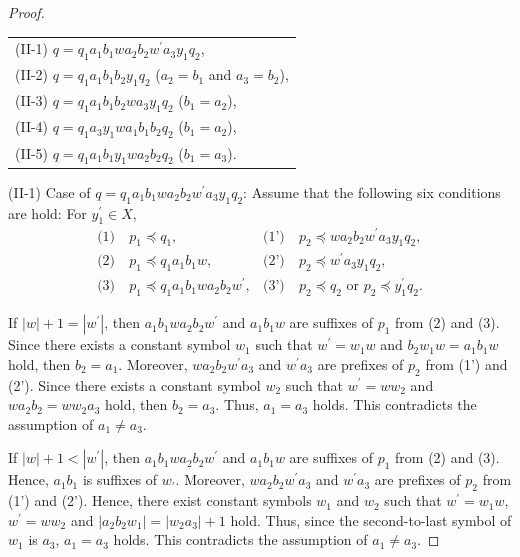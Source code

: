 \begin{proof}
\begin{tabular}{l}
(II-1) $q=q_{1}a_{1}b_{1}wa_{2}b_{2}w^{\prime}a_{3}y_{1}q_{2}$,\\
(II-2) $q=q_{1}a_{1}b_{1}b_{2}y_{1}q_{2}$ ($a_{2}=b_{1}$ and $a_{3}=b_{2}$),\\
(II-3) $q=q_{1}a_{1}b_{1}b_{2}wa_{3}y_{1}q_{2}$ ($b_{1}=a_{2}$),\\
(II-4) $q=q_{1}a_{3}y_{1}wa_{1}b_{1}b_{2}q_{2}$ ($b_{1}=a_{2}$),\\
(II-5) $q=q_{1}a_{1}b_{1}y_{1}wa_{2}b_{2}q_{2}$ ($b_{1}=a_{3}$).
\end{tabular}

\smallskip
\noindent
(II-1) Case of $q=q_{1}a_{1}b_{1}wa_{2}b_{2}w^{\prime}a_{3}y_{1}q_{2}$:
Assume that the following six conditions are hold: For $y_{1}^{\prime}\in X$,
\begin{align*}
\textrm{(1)}~& p_{1} \preceq q_{1}, & \textrm{(1')}~& p_{2} \preceq wa_{2}b_{2}w^{\prime}a_{3}y_{1}q_{2}, \\
\textrm{(2)}~& p_{1} \preceq q_{1}a_{1}b_{1}w, & \textrm{(2')}~& p_{2} \preceq w^{\prime}a_{3}y_{1}q_{2}, \\
\textrm{(3)}~& p_{1} \preceq q_{1}a_{1}b_{1}wa_{2}b_{2}w^{\prime}, & \textrm{(3')}~& p_{2} \preceq q_{2} \mbox{~or~} p_{2} \preceq y_{1}^{\prime}q_{2}.
\end{align*}

If $|w|+1=|w^{\prime}|$, then $a_{1}b_{1}wa_{2}b_{2}w^{\prime}$ and $a_{1}b_{1}w$ are suffixes of $p_{1}$ from (2) and (3).
Since there exists a constant symbol $w_{1}$ such that $w^{\prime}=w_{1}w$ and $b_{2}w_{1}w=a_{1}b_{1}w$ hold,
then $b_{2}=a_{1}$.
Moreover, $wa_{2}b_{2}w^{\prime}a_{3}$ and $w^{\prime}a_{3}$ are prefixes of $p_{2}$ from (1') and (2').
Since there exists a constant symbol $w_{2}$ such that $w^{\prime}=ww_{2}$ and $wa_{2}b_{2}=ww_{2}a_{3}$ hold,
then $b_{2}=a_{3}$.
Thus, $a_{1} = a_{3}$ holds.
This contradicts the assumption of $a_{1} \ne a_{3}$.

If $|w|+1 < |w^{\prime}|$, then $a_{1}b_{1}wa_{2}b_{2}w^{\prime}$ and $a_{1}b_{1}w$ are suffixes of $p_{1}$ from (2) and (3).
Hence, $a_{1}b_{1}$ is suffixes of $w_{\prime}$.
Moreover, $wa_{2}b_{2}w^{\prime}a_{3}$ and $w^{\prime}a_{3}$ are prefixes of $p_{2}$ from (1') and (2').
Hence, there exist constant symbols $w_{1}$ and $w_{2}$ such that $w^{\prime}=w_{1}w$, $w^{\prime}=ww_{2}$ and $|a_{2}b_{2}w_{1}|=|w_{2}a_{3}|+1$ hold.
Thus, since the second-to-last symbol of $w_{1}$ is $a_{3}$, $a_{1}=a_{3}$ holds.
This contradicts the assumption of $a_{1} \ne a_{3}$.


\end{proof}
